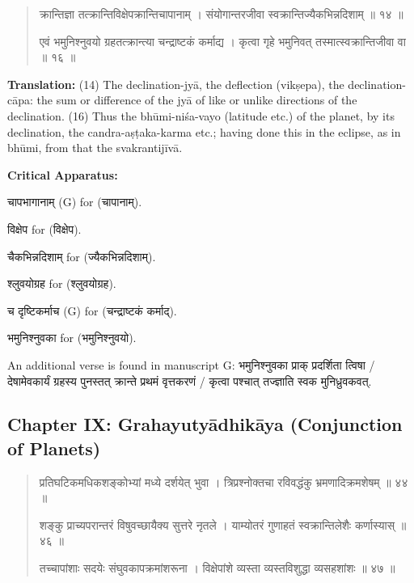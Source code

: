 \documentclass[11pt,a4paper]{article}
\newcommand{\dev}[1]{{\devanagarifont #1}}
\newenvironment{sanskritverse}{%
  \begin{quote}%
  \devanagarifont%
  \setlength{\leftmargin}{2em}%
}{\end{quote}}
\newenvironment{variants}{%
  \small%
  \color{varecolor}%
  \list{}{\leftmargin=2em\itemindent=-1em}%
}{\endlist}
\begin{document}
\begin{sanskritverse}
\dev{क्रान्तिज्ञा तत्क्रान्तिविक्षेपक्रान्तिचापानाम्} ।
\dev{संयोगान्तरजीवा स्वक्रान्तिज्यैकभिन्नदिशाम् ॥ १४ ॥}

\dev{एवं भमुनिश्नुवयो ग्रहतत्क्रान्त्या चन्द्राष्टकं कर्माद्य} ।
\dev{कृत्वा गृहे भमुनिवत् तस्मात्स्वक्रान्तिजीवा वा ॥ १६ ॥}
\end{sanskritverse}

\textbf{Translation:} (14) The declination-jyā, the deflection (vikṣepa), the 
declination-cāpa: the sum or difference of the jyā of like or unlike directions 
of the declination. (16) Thus the bhūmi-niśa-vayo (latitude etc.) of the planet, 
by its declination, the candra-aṣṭaka-karma etc.; having done this in the eclipse, 
as in bhūmi, from that the svakrantijīvā.

\textcolor{varecolor}{\textbf{Critical Apparatus:}}
\begin{variants}
\item[14.1] \dev{चापभागानाम्} (G) \dev{for} (\dev{चापानाम्}).
\item[14.2] \dev{विक्षेप} \dev{for} (\dev{विक्षेप}).
\item[14.3] \dev{चैकभिन्नदिशाम्} \dev{for} (\dev{ज्यैकभिन्नदिशाम्}).
\item[16.1] \dev{श्लुवयोग्रह} \dev{for} (\dev{श्लुवयोग्रह}).
\item[16.2] \dev{च दृष्टिकर्माच} (G) \dev{for} (\dev{चन्द्राष्टकं कर्माद्}).
\item[16.3] \dev{भमुनिश्नुवका} \dev{for} (\dev{भमुनिश्नुवयो}).
\item[\dev{वि०}] An additional verse is found in manuscript G:
\dev{भमुनिश्नुवका प्राक् प्रदर्शिता त्विषा} / 
\dev{देषामेवकार्यं ग्रहस्य पुनस्तत् क्रान्ते प्रथमं वृत्तकरणं} / 
\dev{कृत्वा पश्चात् तज्ज्ञाति स्वक मुनिध्रुवकवत्}.
\end{variants}

\subsection*{Chapter IX: Grahayutyādhikāya (Conjunction of Planets)}

\begin{sanskritverse}
\dev{प्रतिघटिकमधिकशङ्कोभ्यां मध्ये दर्शयेत् भुवा} ।
\dev{त्रिप्रश्नोक्तचा रविवद्धंकु भ्रमणादिक्रमशेषम् ॥ ४४ ॥}

\dev{शङ्कु प्राच्यपरान्तरं विषुवच्छायैक्य सुत्तरे नृतले} ।
\dev{याम्योतरं गुणाहतं स्वक्रान्तिलेशैः कर्णास्यास् ॥ ४६ ॥}

\dev{तच्चापांशाः सदयेः संघुवकापक्रमांशरूना} ।
\dev{विक्षेपांशे व्यस्ता व्यस्तविशुद्धा व्यसहशांशः ॥ ४७ ॥}
\end{sanskritverse}
\end{document}
